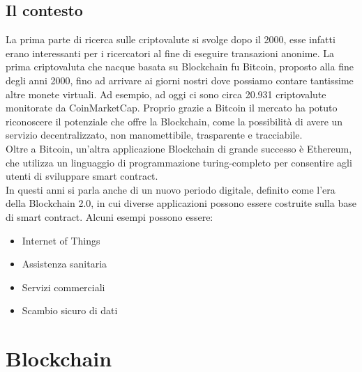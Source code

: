 \documentclass[a4paper,11pt]{report}
\begin{document}
\section{Il contesto}
La prima parte di ricerca sulle criptovalute si svolge dopo il 2000, esse infatti erano interessanti per i ricercatori al fine di eseguire transazioni anonime.
La prima criptovaluta che nacque basata su Blockchain fu Bitcoin, proposto alla fine degli anni 2000, fino ad arrivare ai giorni nostri dove possiamo contare tantissime altre monete virtuali. 
Ad esempio, ad oggi ci sono circa 20.931 criptovalute monitorate da CoinMarketCap. Proprio grazie a Bitcoin il mercato ha potuto riconoscere il potenziale che offre la Blockchain, come la possibilità di avere un servizio decentralizzato, non manomettibile, trasparente e tracciabile.\\
Oltre a Bitcoin, un'altra applicazione Blockchain di grande successo è Ethereum, che utilizza un linguaggio di programmazione turing-completo per consentire agli utenti di sviluppare smart contract.\\
In questi anni si parla anche di un nuovo periodo digitale, definito come l'era della Blockchain 2.0, in cui diverse applicazioni possono essere costruite sulla base di smart contract. Alcuni esempi possono essere:
\begin{itemize}
\item Internet of Things
\item Assistenza sanitaria
\item Servizi commerciali
\item Scambio sicuro di dati
\end{itemize}

\chapter{Blockchain}
\end{document}
